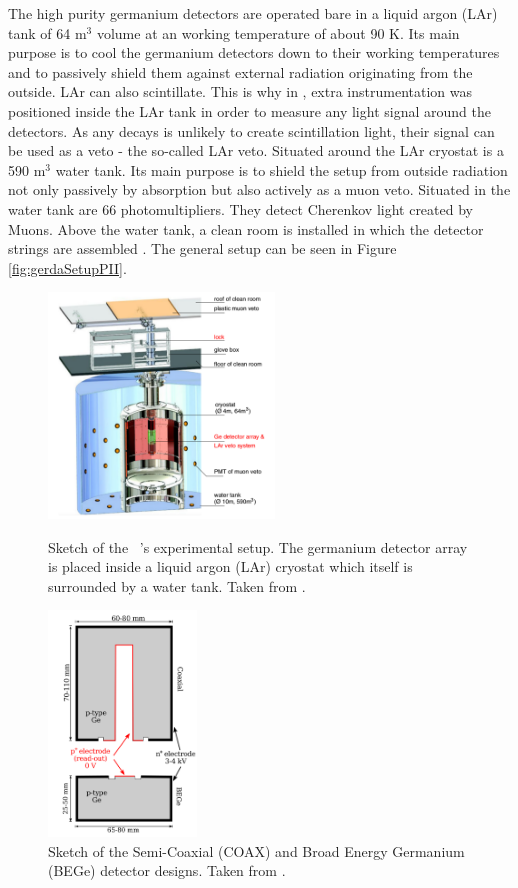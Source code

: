 \documentclass[encoding=utf8,british]{tumphthesis}
\begin{document}
The high purity germanium detectors are operated bare in a liquid argon (LAr) tank of 64 m$^3$ volume at an working temperature of about 90 K.
Its main purpose is to cool the germanium detectors down to their working temperatures and to passively shield them against external radiation originating from the outside.
LAr can also scintillate.
This is why in \PII, extra instrumentation was positioned inside the LAr tank in order to measure any light signal around the detectors.
As any  decays is unlikely to create scintillation light, their signal can be used as a veto - the so-called LAr veto.
Situated around the LAr cryostat is a 590 m$^3$ water tank.
Its main purpose is to shield the setup from outside radiation not only passively by absorption but also actively as a muon veto.
Situated in the water tank are 66 photomultipliers.
They detect Cherenkov light created by Muons.
Above the water tank, a clean room is installed in which the detector strings are assembled  \cite{agostini_background_2017}.  
The general setup can be seen in Figure \ref{fig:gerdaSetupPII}.
\\

\begin{figure}[t!]
	\centering
	\begin{minipage}[t!]{.45\textwidth}
		\centering
		\includegraphics[height=60mm]{./Bilder/GERDAsetupPhaseII.png}
		\caption{Sketch of the \gerda\ \PII's experimental setup. The germanium detector array is placed inside a liquid argon (LAr) cryostat which itself is surrounded by a water tank. Taken from \cite{agostini_background_2017}.}
		\label{fig:gerdaSetupPII}
	\end{minipage}\hfill%
	\begin{minipage}[t!]{.45\textwidth}
		\centering
		\includegraphics[height=60mm]{./Bilder/DetectorDesign.png}
		\caption{Sketch of the Semi-Coaxial (COAX) and Broad Energy Germanium (BEGe) detector designs. Taken from \cite{agostini_background_2014}.}
		\label{fig:DetcDes}
	\end{minipage}
\end{figure}
\end{document}
